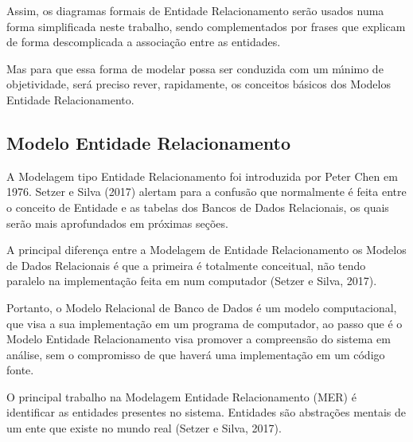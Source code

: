 \documentclass[
12pt,		%
openright,	%
twoside,  %
a4paper,			%
chapter=TITLE,		%
english,			%
french,				%
spanish,			%
brazil				%
]{USPSC-classe/USPSC_RedarTex}
\begin{document}
Assim, os diagramas formais de Entidade Relacionamento ser\~ao usados numa forma simplificada neste trabalho, sendo complementados por frases que explicam de forma descomplicada a associa\c{c}\~ao entre as entidades.










Mas para que essa forma de modelar possa ser conduzida com um m\'{\i}nimo de objetividade, ser\'a preciso rever, rapidamente, os conceitos b\'asicos dos Modelos Entidade Relacionamento.










\subsection[Modelo Entidade Relacionamento]{Modelo Entidade Relacionamento}\label{Modelo Entidade Relacionamento}
A Modelagem tipo Entidade Relacionamento foi introduzida por Peter Chen em 1976. Setzer e Silva (2017) alertam para a confus\~ao que normalmente \'e feita entre o conceito de Entidade e as tabelas dos Bancos de Dados Relacionais, os quais ser\~ao mais aprofundados em pr\'oximas se\c{c}\~oes.










A principal diferen\c{c}a entre a Modelagem de Entidade Relacionamento os Modelos de Dados Relacionais \'e que a primeira \'e totalmente conceitual, n\~ao tendo paralelo na implementa\c{c}\~ao feita em num computador  (Setzer e Silva, 2017).










Portanto, o Modelo Relacional de Banco de Dados \'e um modelo computacional, que visa a sua implementa\c{c}\~ao em um programa de computador, ao passo que \'e o Modelo Entidade Relacionamento visa promover a compreens\~ao do sistema em an\'alise, sem o compromisso de que haver\'a uma implementa\c{c}\~ao em um c\'odigo fonte.










O principal trabalho na Modelagem Entidade Relacionamento (MER) \'e identificar as entidades presentes no sistema. Entidades s\~ao abstra\c{c}\~oes mentais de um ente que existe no mundo real  (Setzer e Silva, 2017).
\end{document}
